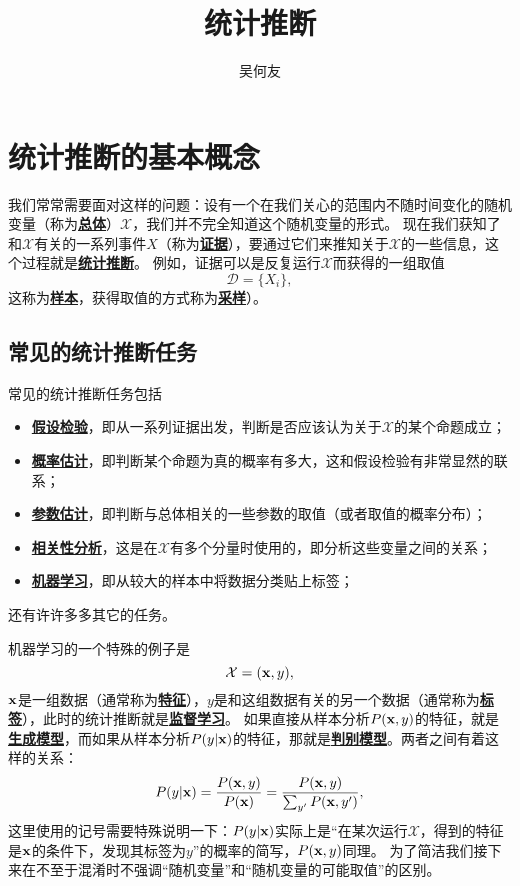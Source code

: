 \documentclass[hyperref, UTF8, a4paper]{ctexart}
\title{统计推断}
\author{吴何友}
\newcommand*{\concept}[1]{\underline{\textbf{#1}}}
\begin{document}
\maketitle

\section{统计推断的基本概念}

我们常常需要面对这样的问题：设有一个在我们关心的范围内不随时间变化的随机变量（称为\concept{总体}）$\mathcal{X}$，我们并不完全知道这个随机变量的形式。
现在我们获知了和$\mathcal{X}$有关的一系列事件$X$（称为\concept{证据}），要通过它们来推知关于$\mathcal{X}$的一些信息，这个过程就是\concept{统计推断}。
例如，证据可以是反复运行$\mathcal{X}$而获得的一组取值
\begin{equation}
    \mathcal{D} = \{X_i\},
\end{equation}
这称为\concept{样本}，获得取值的方式称为\concept{采样}）。

\subsection{常见的统计推断任务}

常见的统计推断任务包括
\begin{itemize}
    \item \concept{假设检验}，即从一系列证据出发，判断是否应该认为关于$\mathcal{X}$的某个命题成立；
    \item \concept{概率估计}，即判断某个命题为真的概率有多大，这和假设检验有非常显然的联系；
    \item \concept{参数估计}，即判断与总体相关的一些参数的取值（或者取值的概率分布）；
    \item \concept{相关性分析}，这是在$\mathcal{X}$有多个分量时使用的，即分析这些变量之间的关系；
    \item \concept{机器学习}，即从较大的样本中将数据分类贴上标签；
\end{itemize}
还有许许多多其它的任务。

机器学习的一个特殊的例子是
\begin{equation}
    \mathcal{X} = (\vb{x}, y),
\end{equation}
$\vb{x}$是一组数据（通常称为\concept{特征}），$y$是和这组数据有关的另一个数据（通常称为\concept{标签}），此时的统计推断就是\concept{监督学习}。
如果直接从样本分析$P(\vb{x}, y)$的特征，就是\concept{生成模型}，而如果从样本分析$P(y|\vb{x})$的特征，那就是\concept{判别模型}。两者之间有着这样的关系：
\begin{equation}
    P(y | \vb{x}) = \frac{P(\vb{x}, y)}{P(\vb{x})} = \frac{P(\vb{x}, y)}{\sum_{y'} P(\vb{x}, y')}, 
\end{equation}
这里使用的记号需要特殊说明一下：$P(y | \vb{x})$实际上是“在某次运行$\mathcal{X}$，得到的特征是$\vb{x}$的条件下，发现其标签为$y$”的概率的简写，$P(\vb{x}, y)$同理。
为了简洁我们接下来在不至于混淆时不强调“随机变量”和“随机变量的可能取值”的区别。                                                
\end{document}
